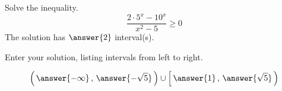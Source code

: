 \documentclass{ximera}
\author{Bobby Ramsey}
\begin{document}
\begin{exercise}
	Solve the inequality.
	\[ \frac{2\cdot 5^x - 10^x}{x^2-5} \geq 0 \]
	The solution has $\answer{2}$ interval(s).
	
	\begin{exercise}
		Enter your solution, listing intervals from left to right.
		
		\[ \left( \, \answer{-\infty} \, , \, \answer{-\sqrt{5}} \, \right) \cup  \left[ \, \answer{1} \, , \, \answer{\sqrt{5}} \, \right) \]
		
	\end{exercise}
\end{exercise}
\end{document}
